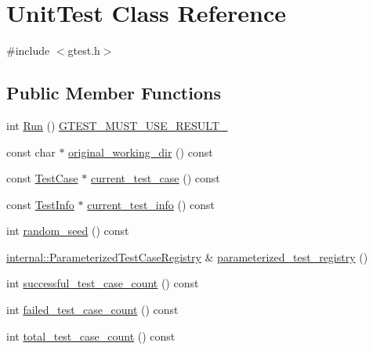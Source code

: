 \hypertarget{classtesting_1_1UnitTest}{\section{\-Unit\-Test \-Class \-Reference}
\label{d5/d21/classtesting_1_1UnitTest}
}


{\ttfamily \#include $<$gtest.\-h$>$}

\subsection*{\-Public \-Member \-Functions}
\begin{DoxyCompactItemize}
\item 
int \hyperlink{classtesting_1_1UnitTest_a22f3e90081aaad35b4eccfa93a28042c}{\-Run} () \hyperlink{gtest-port_8h_a8e5aab8276b2645f64f41c9e3021b935}{\-G\-T\-E\-S\-T\-\_\-\-M\-U\-S\-T\-\_\-\-U\-S\-E\-\_\-\-R\-E\-S\-U\-L\-T\-\_\-}
\item 
const char $\ast$ \hyperlink{classtesting_1_1UnitTest_aadc59d7d9d4cabd496a37c2362d70fb8}{original\-\_\-working\-\_\-dir} () const 
\item 
const \hyperlink{classtesting_1_1TestCase}{\-Test\-Case} $\ast$ \hyperlink{classtesting_1_1UnitTest_a6091b91bf1da1f3994b62bad39d5eb18}{current\-\_\-test\-\_\-case} () const 
\item 
const \hyperlink{classtesting_1_1TestInfo}{\-Test\-Info} $\ast$ \hyperlink{classtesting_1_1UnitTest_a1c2bc6c2c4b47028c19b32ecc625d121}{current\-\_\-test\-\_\-info} () const 
\item 
int \hyperlink{classtesting_1_1UnitTest_ac0bcee84bdc839bfabd0a829642ab4f7}{random\-\_\-seed} () const 
\item 
\hyperlink{classtesting_1_1internal_1_1ParameterizedTestCaseRegistry}{internal\-::\-Parameterized\-Test\-Case\-Registry} \& \hyperlink{classtesting_1_1UnitTest_a01cbd3cb2a5d607047f5f433fac08f40}{parameterized\-\_\-test\-\_\-registry} ()
\item 
int \hyperlink{classtesting_1_1UnitTest_a846de5ff509b207bca6a55237d035a1f}{successful\-\_\-test\-\_\-case\-\_\-count} () const 
\item 
int \hyperlink{classtesting_1_1UnitTest_a48f76adebf95bff36f0026f0a66c7057}{failed\-\_\-test\-\_\-case\-\_\-count} () const 
\item 
int \hyperlink{classtesting_1_1UnitTest_aba8c18261c58f301e1e80049a0781d84}{total\-\_\-test\-\_\-case\-\_\-count} () const 
\item 

\end{DoxyCompactItemize}
